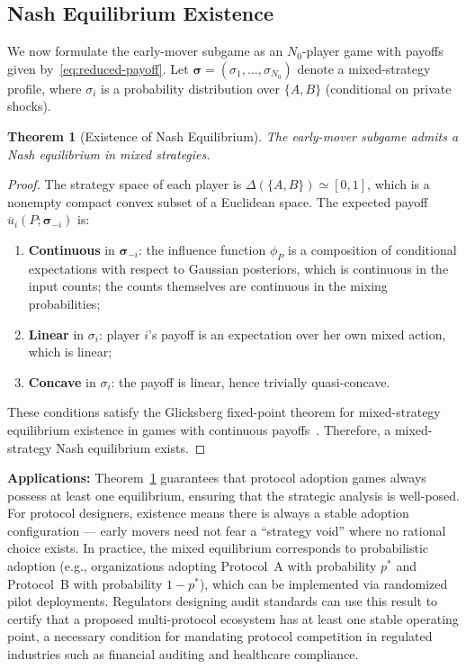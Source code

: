\documentclass[12pt,a4paper]{article}
\newtheorem{theorem}{Theorem}[section]
\begin{document}
\subsection{Nash Equilibrium Existence}

We now formulate the early-mover subgame as an $N_0$-player game with
payoffs given by~\eqref{eq:reduced-payoff}.  Let
$\boldsymbol{\sigma}=(\sigma_1,\dots,\sigma_{N_0})$ denote a mixed-strategy
profile, where $\sigma_i$ is a probability distribution over $\{A,B\}$
(conditional on private shocks).

\begin{theorem}[Existence of Nash Equilibrium]
\label{thm:existence}
The early-mover subgame admits a Nash equilibrium in mixed strategies.
\end{theorem}

\begin{proof}
The strategy space of each player is $\Delta(\{A,B\})\simeq[0,1]$, which is a
nonempty compact convex subset of a Euclidean space.  The expected payoff
$\overline{u}_i(P;\boldsymbol{\sigma}_{-i})$ is:
\begin{enumerate}[label=(\roman*)]
    \item \textbf{Continuous} in $\boldsymbol{\sigma}_{-i}$: the influence
          function $\phi_P$ is a composition of conditional expectations with
          respect to Gaussian posteriors, which is continuous in the input
          counts; the counts themselves are continuous in the mixing
          probabilities;
    \item \textbf{Linear} in $\sigma_i$: player $i$'s payoff is an
          expectation over her own mixed action, which is linear;
    \item \textbf{Concave} in $\sigma_i$: the payoff is linear, hence
          trivially quasi-concave.
\end{enumerate}
These conditions satisfy the Glicksberg fixed-point theorem for
mixed-strategy equilibrium existence in games with continuous
payoffs~\citep{glicksberg1952further}.  Therefore, a mixed-strategy Nash
equilibrium exists.
\end{proof}

\medskip\noindent
\textbf{Applications:}
Theorem~\ref{thm:existence} guarantees that protocol adoption games always
possess at least one equilibrium, ensuring that the strategic analysis is
well-posed.  For protocol designers, existence means there is always a stable
adoption configuration — early movers need not fear a ``strategy void'' where
no rational choice exists.  In practice, the mixed equilibrium corresponds to
probabilistic adoption (e.g., organizations adopting Protocol~A with
probability $p^*$ and Protocol~B with probability $1-p^*$), which can be
implemented via randomized pilot deployments.  Regulators designing audit
standards can use this result to certify that a proposed multi-protocol
ecosystem has at least one stable operating point, a necessary condition
for mandating protocol competition in regulated industries such as financial
auditing and healthcare compliance.
\end{document}
